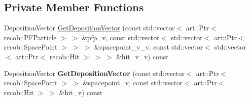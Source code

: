 \subsection*{Private Member Functions}
\begin{DoxyCompactItemize}
\item 
Deposition\-Vector \hyperlink{classflashmatch_1_1FlashMatchingTool_1_1SliceCandidate_a86c84dbe03676ae04a64a45e7c449b0e}{Get\-Deposition\-Vector} (const std\-::vector$<$ art\-::\-Ptr$<$ recob\-::\-P\-F\-Particle $>$ $>$ \&pfp\-\_\-v, const std\-::vector$<$ std\-::vector$<$ art\-::\-Ptr$<$ recob\-::\-Space\-Point $>$ $>$ $>$ \&spacepoint\-\_\-v\-\_\-v, const std\-::vector$<$ std\-::vector$<$ art\-::\-Ptr$<$ recob\-::\-Hit $>$ $>$ $>$ \&hit\-\_\-v\-\_\-v) const 
\item 
\hypertarget{classflashmatch_1_1FlashMatchingTool_1_1SliceCandidate_aae12341bbdb7d9f2120f0fd25a227f24}{Deposition\-Vector {\bfseries Get\-Deposition\-Vector} (const std\-::vector$<$ art\-::\-Ptr$<$ recob\-::\-Space\-Point $>$ $>$ \&spacepoint\-\_\-v, const std\-::vector$<$ art\-::\-Ptr$<$ recob\-::\-Hit $>$ $>$ \&hit\-\_\-v) const }\label{classflashmatch_1_1FlashMatchingTool_1_1SliceCandidate_aae12341bbdb7d9f2120f0fd25a227f24}


\end{DoxyCompactItemize}
